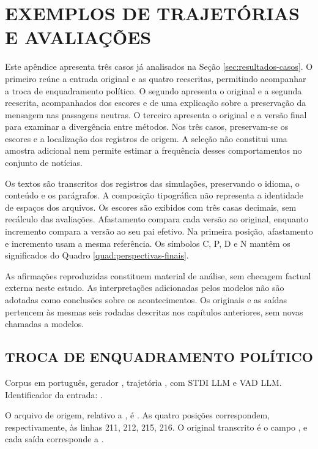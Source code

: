 \chapter{EXEMPLOS DE TRAJETÓRIAS E AVALIAÇÕES}
\label{ap:casos}

Este apêndice apresenta três casos já analisados na Seção \ref{sec:resultados-casos}. O primeiro reúne a entrada original e as quatro reescritas, permitindo acompanhar a troca de enquadramento político. O segundo apresenta o original e a segunda reescrita, acompanhados dos escores e de uma explicação sobre a preservação da mensagem nas passagens neutras. O terceiro apresenta o original e a versão final para examinar a divergência entre métodos. Nos três casos, preservam-se os escores e a localização dos registros de origem. A seleção não constitui uma amostra adicional nem permite estimar a frequência desses comportamentos no conjunto de notícias.

Os textos são transcritos dos registros das simulações, preservando o idioma, o conteúdo e os parágrafos. A composição tipográfica não representa a identidade de espaços dos arquivos. Os escores são exibidos com três casas decimais, sem recálculo das avaliações. Afastamento compara cada versão ao original, enquanto incremento compara a versão ao seu pai efetivo. Na primeira posição, afastamento e incremento usam a mesma referência. Os símbolos C, P, D e N mantêm os significados do Quadro \ref{quad:perspectivas-finais}.

As afirmações reproduzidas constituem material de análise, sem checagem factual externa neste estudo. As interpretações adicionadas pelos modelos não são adotadas como conclusões sobre os acontecimentos. Os originais e as saídas pertencem às mesmas seis rodadas descritas nos capítulos anteriores, sem novas chamadas a modelos.

\section{TROCA DE ENQUADRAMENTO POLÍTICO}
\label{sec:ap-caso-politico}

Corpus em português, gerador , trajetória , com STDI LLM e VAD LLM. Identificador da entrada: .

O arquivo de origem, relativo a , é . As quatro posições correspondem, respectivamente, às linhas 211, 212, 215, 216. O original transcrito é o campo , e cada saída corresponde a .

